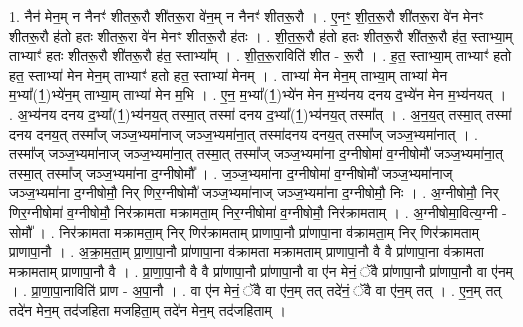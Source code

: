 \documentclass[17pt]{extarticle}
\begin{document}
1. नैन॑ मेन॒म् न नैनꣳ॑ शीतरू॒रौ शी॑तरू॒रा वे॑न॒म् न नैनꣳ॑ शीतरू॒रौ । . ए॒नꣳ॒॒ शी॒त॒रू॒रौ शी॑तरू॒रा वे॑न मेनꣳ शीतरू॒रौ ह॑तो हतः शीतरू॒रा वे॑न मेनꣳ शीतरू॒रौ ह॑तः । . शी॒त॒रू॒रौ ह॑तो हतः शीतरू॒रौ शी॑तरू॒रौ ह॑त॒ स्ताभ्या॒म् ताभ्याꣳ॑ हतः शीतरू॒रौ शी॑तरू॒रौ ह॑त॒ स्ताभ्या᳚म् । . शी॒त॒रू॒राविति॑ शीत - रू॒रौ । . ह॒त॒ स्ताभ्या॒म् ताभ्याꣳ॑ हतो हत॒ स्ताभ्या॑ मेन मेन॒म् ताभ्याꣳ॑ हतो हत॒ स्ताभ्या॑ मेनम् । . ताभ्या॑ मेन मेन॒म् ताभ्या॒म् ताभ्या॑ मेन म॒भ्या᳚(1॒)भ्ये॑न॒म् ताभ्या॒म् ताभ्या॑ मेन म॒भि । . ए॒न॒ म॒भ्या᳚(1॒)भ्ये॑न मेन म॒भ्य॑नय दनय द॒भ्ये॑न मेन म॒भ्य॑नयत् । . अ॒भ्य॑नय दनय द॒भ्या᳚(1॒)भ्य॑नय॒त् तस्मा॒त् तस्मा॑ दनय द॒भ्या᳚(1॒)भ्य॑नय॒त् तस्मा᳚त् । . अ॒न॒य॒त् तस्मा॒त् तस्मा॑ दनय दनय॒त् तस्मा᳚ज् जञ्ज॒भ्यमा॑नाज् जञ्ज॒भ्यमा॑ना॒त् तस्मा॑दनय दनय॒त् तस्मा᳚ज् जञ्ज॒भ्यमा॑नात् । . तस्मा᳚ज् जञ्ज॒भ्यमा॑नाज् जञ्ज॒भ्यमा॑ना॒त् तस्मा॒त् तस्मा᳚ज् जञ्ज॒भ्यमा॑ना द॒ग्नीषोमा॑ व॒ग्नीषोमौ॑ जञ्ज॒भ्यमा॑ना॒त् तस्मा॒त् तस्मा᳚ज् जञ्ज॒भ्यमा॑ना द॒ग्नीषोमौ᳚ । . ज॒ञ्ज॒भ्यमा॑ना द॒ग्नीषोमा॑ व॒ग्नीषोमौ॑ जञ्ज॒भ्यमा॑नाज् जञ्ज॒भ्यमा॑ना द॒ग्नीषोमौ॒ निर् णिर॒ग्नीषोमौ॑ जञ्ज॒भ्यमा॑नाज् जञ्ज॒भ्यमा॑ना द॒ग्नीषोमौ॒ निः । . अ॒ग्नीषोमौ॒ निर् णिर॒ग्नीषोमा॑ व॒ग्नीषोमौ॒ निर॑क्रामता मक्रामता॒म् निर॒ग्नीषोमा॑ व॒ग्नीषोमौ॒ निर॑क्रामताम् । . अ॒ग्नीषोमा॒वित्य॒ग्नी - सोमौ᳚ । . निर॑क्रामता मक्रामता॒म् निर् णिर॑क्रामताम् प्राणापा॒नौ प्रा॑णापा॒ना व॑क्रामता॒म् निर् णिर॑क्रामताम् प्राणापा॒नौ । . अ॒क्रा॒म॒ता॒म् प्रा॒णा॒पा॒नौ प्रा॑णापा॒ना व॑क्रामता मक्रामताम् प्राणापा॒नौ वै वै प्रा॑णापा॒ना व॑क्रामता मक्रामताम् प्राणापा॒नौ वै । . प्रा॒णा॒पा॒नौ वै वै प्रा॑णापा॒नौ प्रा॑णापा॒नौ वा ए॑न मेनं॒ ॅवै प्रा॑णापा॒नौ प्रा॑णापा॒नौ वा ए॑नम् । . प्रा॒णा॒पा॒नाविति॑ प्राण - अ॒पा॒नौ । . वा ए॑न मेनं॒ ॅवै वा ए॑न॒म् तत् तदे॑नं॒ ॅवै वा ए॑न॒म् तत् । . ए॒न॒म् तत् तदे॑न मेन॒म् तद॑जहिता मजहिता॒म् तदे॑न मेन॒म् तद॑जहिताम् । \newline
\end{document}
